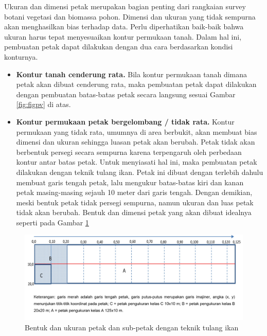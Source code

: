 \documentclass[
]{book}
\providecommand{\tightlist}{%
  \setlength{\itemsep}{0pt}\setlength{\parskip}{0pt}}
\begin{document}
Ukuran dan dimensi petak merupakan bagian penting dari rangkaian survey botani vegetasi dan biomassa pohon. Dimensi dan ukuran yang tidak sempurna akan menghasilkan bias terhadap data. Perlu diperhatikan baik-baik bahwa ukuran harus tepat menyesuaikan kontur permukaan tanah. Dalam hal ini, pembuatan petak dapat dilakukan dengan dua cara berdasarkan kondisi konturnya.

\begin{itemize}
\tightlist
\item
  \textbf{Kontur tanah cenderung rata.} Bila kontur permukaan tanah dimana petak akan dibuat cenderung rata, maka pembuatan petak dapat dilakukan dengan pembuatan batas-batas petak secara langsung sesuai Gambar \ref{fig:figpv} di atas.
\item
  \textbf{Kontur permukaan petak bergelombang / tidak rata.} Kontur permukaan yang tidak rata, umumnya di area berbukit, akan membuat bias dimensi dan ukuran sehingga luasan petak akan berubah. Petak tidak akan berbentuk persegi secara sempurna karena terpengaruh oleh perbedaan kontur antar batas petak. Untuk menyiasati hal ini, maka pembuatan petak dilakukan dengan teknik tulang ikan. Petak ini dibuat dengan terlebih dahulu membuat garis tengah petak, lalu mengukur batas-batas kiri dan kanan petak masing-masing sejauh 10 meter dari garis tengah. Dengan demikian, meski bentuk petak tidak persegi sempurna, namun ukuran dan luas petak tidak akan berubah. Bentuk dan dimensi petak yang akan dibuat idealnya seperti pada Gambar \ref{fig:figtiv}
\end{itemize}

\begin{figure}

{\centering \includegraphics[width=1\linewidth]{images/tiv_ilustration} 

}

\caption{Bentuk dan ukuran petak dan sub-petak dengan teknik tulang ikan}\label{fig:figtiv}
\end{figure}
\end{document}
